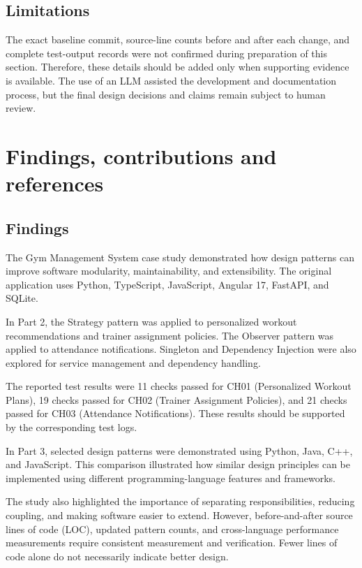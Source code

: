\documentclass[11pt,a4paper]{article}
\begin{document}
\subsection{Limitations}

The exact baseline commit, source-line counts before and after
each change, and complete test-output records were not
confirmed during preparation of this section. Therefore,
these details should be added only when supporting evidence
is available. The use of an LLM assisted the development and
documentation process, but the final design decisions and
claims remain subject to human review.
\section{Findings, contributions and references}


\subsection*{Findings}

The Gym Management System case study demonstrated how design
patterns can improve software modularity, maintainability, and
extensibility. The original application uses Python, TypeScript,
JavaScript, Angular 17, FastAPI, and SQLite.

In Part 2, the Strategy pattern was applied to personalized
workout recommendations and trainer assignment policies.
The Observer pattern was applied to attendance notifications.
Singleton and Dependency Injection were also explored for
service management and dependency handling.

The reported test results were 11 checks passed for CH01
(Personalized Workout Plans), 19 checks passed for CH02
(Trainer Assignment Policies), and 21 checks passed for CH03
(Attendance Notifications). These results should be supported
by the corresponding test logs.

In Part 3, selected design patterns were demonstrated using
Python, Java, C++, and JavaScript. This comparison illustrated
how similar design principles can be implemented using
different programming-language features and frameworks.

The study also highlighted the importance of separating
responsibilities, reducing coupling, and making software
easier to extend. However, before-and-after source lines of
code (LOC), updated pattern counts, and cross-language
performance measurements require consistent measurement and
verification. Fewer lines of code alone do not necessarily
indicate better design.
\end{document}
